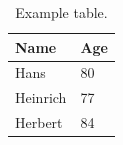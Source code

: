 \begin{table}
    \centering
    \caption{Example table.}
    \begin{tabular}{ll}\toprule
    \textbf{Name}  & \textbf{Age} \\ \midrule
    Hans           & 80             \\
    Heinrich       & 77             \\
    Herbert        & 84             \\ \bottomrule
    \end{tabular}
    \label{tbl:table1}
\end{table}

